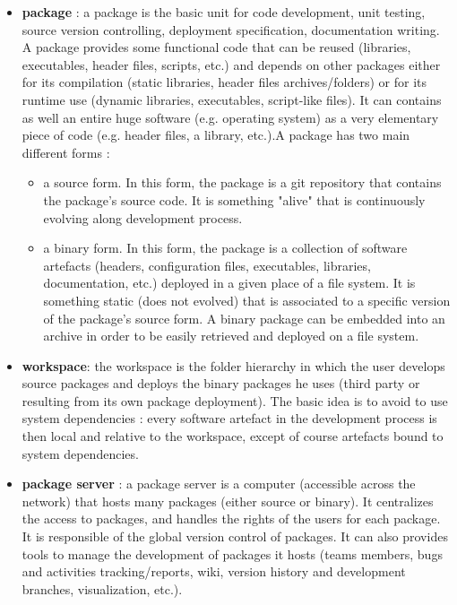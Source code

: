 \documentclass[12pt,a4paper]{article}
\begin{document}
\begin{itemize}

\item \textbf{package} : a package is the basic unit for code development, unit testing, source version controlling, deployment specification, documentation writing. A package provides some functional code that can be reused (libraries, executables, header files, scripts, etc.) and depends on other packages either for its compilation (static libraries, header files archives/folders) or for its runtime use (dynamic libraries, executables, script-like files). It can contains as well an entire huge software (e.g. operating system) as a very elementary piece of code (e.g. header files, a library, etc.).A package has two main different forms :
\begin{itemize}
\item a source form. In this form, the package is a git repository that contains the  package's source code. It is something "alive" that is continuously evolving along development process.
\item a binary form. In this form, the package is a collection of software artefacts (headers, configuration files, executables, libraries, documentation, etc.) deployed in a given place of a file system. It is something static (does not evolved) that is associated to a specific version of the package's source form. A binary package can be embedded into an archive in order to be easily retrieved and deployed on a file system.
\end{itemize}

\item \textbf{workspace}:  the workspace is the folder hierarchy in which the user develops source packages and deploys the binary packages he uses (third party or resulting from its own package deployment). The basic idea is to avoid to use system dependencies : every software artefact in the development process is then local and relative to the workspace, except of course artefacts bound to system dependencies. 

\item \textbf{package server} : a package server is a computer (accessible across the network) that hosts many packages (either source or binary). It centralizes the access to packages, and handles the rights of the users for each package. It is responsible of the global version control of packages. It can also provides tools to manage the development of packages it hosts (teams members, bugs and activities tracking/reports, wiki, version history and development branches, visualization, etc.).
\end{itemize}
 
\end{document}
